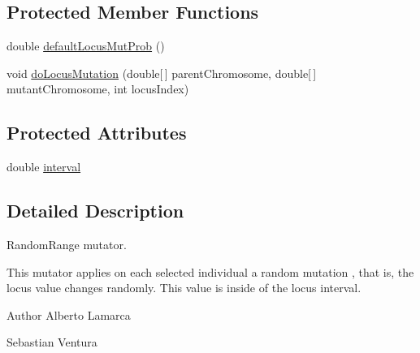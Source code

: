 \subsection*{Protected Member Functions}
\begin{DoxyCompactItemize}
\item 
double \hyperlink{classnet_1_1sf_1_1jclec_1_1realarray_1_1mut_1_1_random_range_mutator_ab43ed6e7b6a0cc324e41c41f4a7fbe7c}{default\-Locus\-Mut\-Prob} ()
\item 
void \hyperlink{classnet_1_1sf_1_1jclec_1_1realarray_1_1mut_1_1_random_range_mutator_a65b990abd0a6143755730aa60f88570b}{do\-Locus\-Mutation} (double\mbox{[}$\,$\mbox{]} parent\-Chromosome, double\mbox{[}$\,$\mbox{]} mutant\-Chromosome, int locus\-Index)
\end{DoxyCompactItemize}
\subsection*{Protected Attributes}
\begin{DoxyCompactItemize}
\item 
double \hyperlink{classnet_1_1sf_1_1jclec_1_1realarray_1_1mut_1_1_random_range_mutator_a2c3337c4ddd2f12713c13de5486b7c5c}{interval}
\end{DoxyCompactItemize}


\subsection{Detailed Description}
Random\-Range mutator.

This mutator applies on each selected individual a random mutation , that is, the locus value changes randomly. This value is inside of the locus interval.

\begin{DoxyAuthor}{Author}
Alberto Lamarca 

Sebastian Ventura 
\end{DoxyAuthor}


